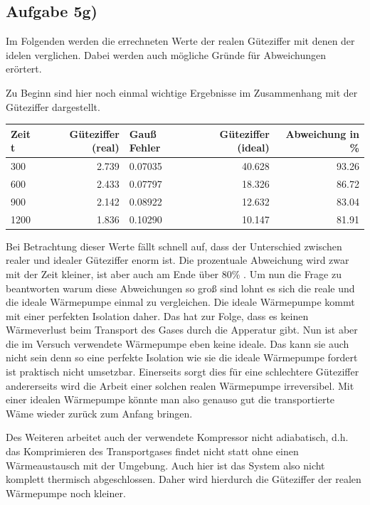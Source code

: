 \documentclass[titlepage=firstcover, captions=tableheading]{scrartcl}
\begin{document}
\subsection{Aufgabe 5g)}

Im Folgenden werden die errechneten Werte der realen Güteziffer mit denen der idelen verglichen.
Dabei werden auch mögliche Gründe für Abweichungen erörtert. 

Zu Beginn sind hier noch einmal wichtige Ergebnisse im Zusammenhang mit der Güteziffer dargestellt.
\begin{center}
    \begin{tabular}{lr@{${}\pm{}$}lrr}
        \toprule
        {Zeit t} & { Güteziffer (real)} & {Gauß Fehler} & {Güteziffer (ideal)} & {Abweichung in \%} \\
        \midrule
        300 & 2.739 & 0.07035  & 40.628 & 93.26 \\
        600 & 2.433 & 0.07797  & 18.326 & 86.72 \\
        900 & 2.142 & 0.08922 & 12.632 & 83.04 \\
        1200 & 1.836 & 0.10290 & 10.147 & 81.91\\
        \bottomrule
        
    \end{tabular}
\end{center}

\noindent Bei Betrachtung dieser Werte fällt schnell auf, dass der Unterschied zwischen realer und idealer Güteziffer enorm ist.
Die prozentuale Abweichung wird zwar mit der Zeit kleiner, ist aber auch am Ende über 80\% .
Um nun die Frage zu beantworten warum diese Abweichungen so groß sind lohnt es sich die reale und die ideale Wärmepumpe einmal zu vergleichen.
Die ideale Wärmepumpe kommt mit einer perfekten Isolation daher. 
Das hat zur Folge, dass es keinen Wärmeverlust beim Transport des Gases durch die Apperatur gibt.
Nun ist aber die im Versuch verwendete Wärmepumpe eben keine ideale. 
Das kann sie auch nicht sein denn so eine perfekte Isolation wie sie die ideale Wärmepumpe fordert ist praktisch nicht umsetzbar.
Einerseits sorgt dies für eine schlechtere Güteziffer andererseits wird die Arbeit einer solchen realen Wärmepumpe irreversibel.
Mit einer idealen Wärmepumpe könnte man also genauso gut die transportierte Wäme wieder zurück zum Anfang bringen.

\noindent Des Weiteren arbeitet auch der verwendete Kompressor nicht adiabatisch, 
d.h. das Komprimieren des Transportgases findet nicht statt ohne einen Wärmeaustausch mit der Umgebung.
Auch hier ist das System also nicht komplett thermisch abgeschlossen.
Daher wird hierdurch die Güteziffer der realen Wärmepumpe noch kleiner.
\end{document}
